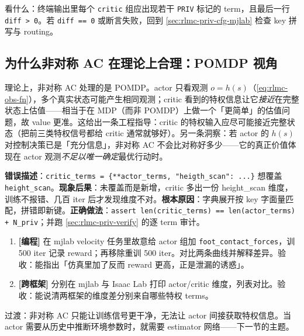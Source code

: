 看什么：终端输出里每个 \verb|critic| 组应出现若干 \verb|PRIV| 标记的 term，且最后一行 \verb|diff > 0|。若 \verb|diff == 0| 或断言失败，回到 \cref{sec:rlmc-priv-cfg-mjlab} 检查 key 拼写与 routing。

\subsection{为什么非对称 AC 在理论上合理：POMDP 视角}
\label{sec:rlmc-priv-pomdp}

理论上，非对称 AC 处理的是 POMDP。actor 只看观测 $o=h(s)$（\cref{eq:rlmc-obs-fn}），多个真实状态可能产生相同观测；critic 看到的特权信息让它\emph{接近}在完整状态上估值——相当于在 MDP（而非 POMDP）上做一个「更简单」的估值问题，故 value 更准。这给出一条工程指导：critic 的特权输入应尽可能接近完整状态（把前三类特权信号都给 critic 通常就够好）。另一条洞察：若 actor 的 $h(s)$ 对控制决策已是「充分信息」，非对称 AC 不会比对称好多少——它的真正价值体现在 actor 观测\emph{不足以唯一确定}最优行动时。

\begin{pitfall}
\textbf{错误描述}：\verb|critic_terms = {**actor_terms, "heigth_scan": ...}| 想覆盖 \verb|height_scan|。\textbf{现象后果}：未覆盖而是新增，critic 多出一份 height\_scan 维度，训练不报错、几百 iter 后才发现维度不对。\textbf{根本原因}：字典展开按 key 字面量匹配，拼错即新键。\textbf{正确做法}：\verb|assert len(critic_terms) == len(actor_terms) + N_priv|；并跑 \cref{sec:rlmc-priv-verify} 的逐 term 审计。
\end{pitfall}

\begin{practice}[本节练习]
\begin{enumerate}
  \item \textbf{[编程]} 在 mjlab velocity 任务里故意给 actor 组加 \verb|foot_contact_forces|，训 500 iter 记录 reward；再移除重训 500 iter。对比两条曲线并解释差异。验收：能指出「仿真里加了反而 reward 更高，正是泄漏的诱惑」。
  \item \textbf{[跨框架]} 分别在 mjlab 与 Isaac Lab 打印 actor/critic 维度，列表对比。验收：能说清两框架的维度差分别来自哪些特权 terms。
\end{enumerate}
\end{practice}

过渡：非对称 AC 只能让训练信号更干净，无法让 actor 间接获取特权信息。当 actor 需要从历史中推断环境参数时，就需要 estimator 网络——下一节的主题。

